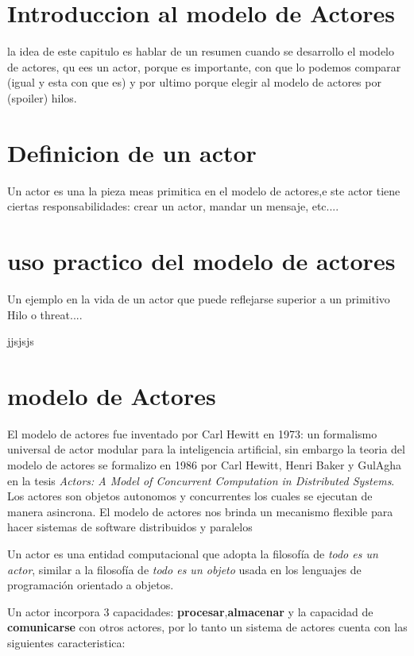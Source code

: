 \section{Introduccion al modelo de Actores}

la idea de este capitulo es hablar de un resumen cuando se desarrollo
el modelo de actores, qu ees un actor, porque es importante, con que
lo podemos comparar (igual y esta con que es) y por ultimo porque
elegir al modelo de actores por (spoiler) hilos.

\section{Definicion de un actor}
Un actor es una la pieza meas primitica en el modelo de actores,e ste
actor tiene ciertas responsabilidades: crear un actor, mandar un
mensaje, etc....


\section{uso practico del modelo de actores}
Un ejemplo en la vida de un actor que puede reflejarse superior a un
primitivo Hilo o threat....




jjsjsjs

\section{modelo de Actores}
El modelo de actores fue inventado por Carl Hewitt en 1973: un
formalismo universal de actor modular
para la inteligencia artificial, sin embargo la teoria del modelo de
actores se formalizo en 1986 por Carl Hewitt, Henri Baker y GulAgha en
la tesis \emph{Actors: A Model of Concurrent Computation in
  Distributed Systems}. Los actores son objetos autonomos y
concurrentes los cuales se ejecutan de manera asincrona. El modelo de
actores nos brinda un mecanismo flexible para hacer sistemas de
software distribuidos y paralelos

Un actor es una entidad computacional que adopta la filosof\'ia de
\emph{todo es un actor}, similar a la filosof\'ia de \emph{todo es un
  objeto} usada en los lenguajes de programaci\'on orientado a
objetos.


Un actor incorpora 3 capacidades: \textbf{procesar},\textbf{almacenar}
y la capacidad de \textbf{comunicarse} con otros actores, por lo tanto
un sistema de actores cuenta con las siguientes caracteristica:

